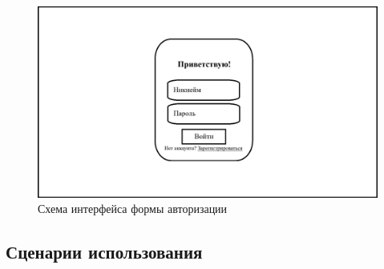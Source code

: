 \begin{figure}[ht]
	\centering
	\includegraphics[width=0.8\linewidth]{"images/UI макет авторизации"}
	\caption{Схема интерфейса формы авторизации}
	\label{fig:ui-auth}
\end{figure}

\subsection{Сценарии использования}

